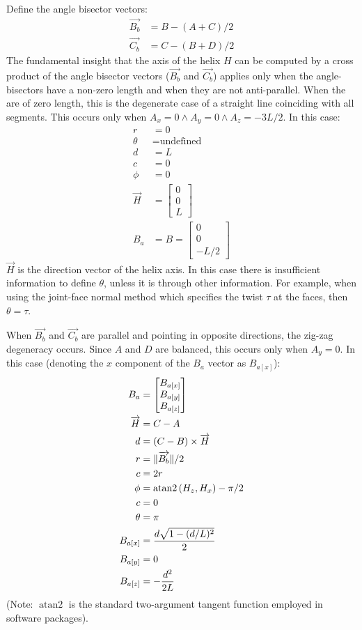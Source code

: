 \documentclass[11pt]{article}
\DeclarePairedDelimiter{\norm}{\lVert}{\rVert}
\DeclareMathOperator{\atantwo}{atan2}
\begin{document}
{Define the angle bisector vectors:
\begin{align}
  \overrightarrow{B_b} &= B - (A + C)/2 \\
  \overrightarrow{C_b} &= C - (B + D)/2
  \end{align}
The fundamental insight that the axis of the helix $H$ can be
computed by a cross product of the angle bisector
vectors ($\overrightarrow{B_b}$ and $\overrightarrow{C_b}$) applies only
when the angle-bisectors have a non-zero length and when
they are not anti-parallel. When the are of zero length, this is
the degenerate case of a straight line coinciding with all segments.
This occurs only when $A_x = 0 \wedge A_y = 0 \wedge A_z = -3L/2$.
In this case:
\begin{align}
  r &= 0 \\
  \theta &= \text{undefined}\\
  d &= L \\
  c &= 0 \\
  \phi &= 0 \\
  \overrightarrow{H} &=  \begin{bmatrix} 0 \\ 0 \\ L  \end{bmatrix} \\
  B_a &= B = \begin{bmatrix} 0 \\ 0 \\ -L/2  \end{bmatrix}
\end{align}
$\overrightarrow{H}$ is the direction vector of the helix axis.
In this case there is insufficient information to define $\theta$,
unless it is through other information. For example, when using
the joint-face normal method which specifies
the twist $\tau$ at the faces, then $\theta = \tau$.

When $\overrightarrow{B_b}$ and $\overrightarrow{C_b}$ are parallel and pointing in opposite directions,
the zig-zag degeneracy occurs. Since
$A$ and $D$ are balanced, this occurs only when $A_y = 0$.
In this case (denoting the $x$ component of the $B_a$ vector as $B_{a[x]}$):
\begin{align}
  B_{a} &= \begin{bmatrix} B_{a[x]} \\ B_{a[y]} \\ B_{a[z]}  \end{bmatrix} \\
  \overrightarrow{H} &=  C - A \\
  d &= (C - B) \times \overrightarrow{H} \\
  r &= \norm{\overrightarrow{B_b}} / 2 \\
  c &= 2 r\\
  \phi &= \atantwo{(H_z,H_x)} - \pi/2 \\
  c &= 0 \\
  \theta &= \pi \\
  B_{a[x]} &= \frac{d\sqrt{1 - (d/L)^2}}{2} \\
  B_{a[y]} &= 0 \\
  B_{a[z]} &= -\frac{d^2}{2L}
\end{align}
(Note: $\atantwo$ is the standard two-argument tangent function employed in software packages).

}
\end{document}
